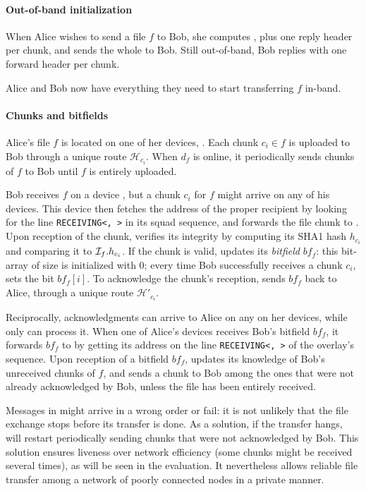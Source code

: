 \paragraph*{Out-of-band initialization} 
When Alice wishes to send a file $f$ to Bob, she computes \finfo, 
plus one reply header per chunk, and sends the whole to Bob.
Still out-of-band, Bob replies with one forward header per chunk.

Alice and Bob now have everything they need to start transferring $f$ in-band.

\newcommand\bitfield{\ensuremath{bf_f}\xspace}
\paragraph*{Chunks and bitfields}
Alice's file $f$ is located on one of her devices, \sendingdevice. 
Each chunk $c_i \in f$ is uploaded to Bob through a unique route $\mathcal{H}_{c_i}$.
When $d_f$ is online, it periodically sends chunks of $f$ to Bob until $f$ is entirely uploaded.

Bob receives $f$ on a device \recdevice, but a chunk $c_i$ for $f$ might arrive on any of his devices. 
This device then fetches the address of the proper recipient \recdevice by looking for the line \texttt{RECEIVING<\recdevice, \fileid>} in its squad sequence, 
and forwards the file chunk to \recdevice.
Upon reception of the chunk, \recdevice verifies its integrity by computing its SHA1 hash $h_{c_i}$ and comparing it to $\mathcal{I}_f.h_{c_i}$.
If the chunk is valid, \recdevice updates its \emph{bitfield} \bitfield: this bit-array of size \nchunks is initialized with 0;
every time Bob successfully receives a chunk $c_i$, \recdevice sets the bit $\bitfield[i]$.
To acknowledge the chunk's reception, \recdevice sends \bitfield back to Alice, through a unique route $\mathcal{H}'_{c_i}$.

Reciprocally, acknowledgments can arrive to Alice on any on her devices, while only \sendingdevice can process it.
When one of Alice's devices receives Bob's bitfield \bitfield, 
it forwards \bitfield to \sendingdevice by getting its address on the line \texttt{RECEIVING<\sendingdevice, \fileid>} of the \squad overlay's sequence.
Upon reception of a bitfield \bitfield, \recdevice updates its knowledge of Bob's unreceived chunks of $f$,
and sends a chunk to Bob among the ones that were not already acknowledged by Bob, unless the file has been entirely received.

Messages in \name might arrive in a wrong order or fail:
it is not unlikely that the file exchange stops before its transfer is done.
As a solution, if the transfer hangs, \sendingdevice will restart periodically sending chunks that were not acknowledged by Bob.
This solution ensures liveness over network efficiency (some chunks might be received several times), as will be seen in the evaluation.
It nevertheless allows reliable file transfer among a network of poorly connected nodes in a private manner.